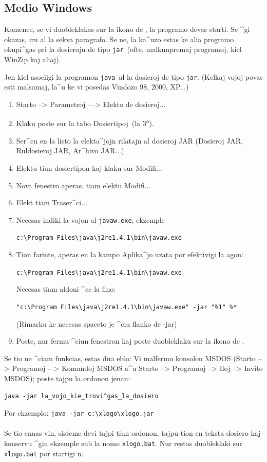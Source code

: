 \subsection{Medio Windows}
Komence, se vi duobleklakas sur la ikono de \xlogo, la programo devas
starti.  Se ^gi okazas, iru al la sekva paragrafo.  Se ne, la ka^uzo
estas ke alia programo okupi^gas pri la dosierojn de tipo
\og\texttt{jar}\fg\ (ofte, malkunpremaj programoj, kiel WinZip kaj
aliaj).

Jen kiel asociigi la programon \og\texttt{java}\fg\ al la dosieroj de
tipo \og \texttt{jar}\fg.  (Kelkaj vojoj povas esti malsamaj, la^u ke
vi posedas Vindozo 98, 2000, XP...)
\begin{enumerate}
\item Starto –> Parametroj —> Elekto de dosieroj...
\item Klaku poste sur la tabo \og Dosiertipoj\fg\ (la
  3\textsuperscript{a}).
\item Ser^cu en la listo la elekta^jojn rilatajn al dosieroj JAR
  (Dosieroj JAR, Ruldosieroj JAR, Ar^hivo JAR...)
\item Elektu tiun dosiertipon kaj klaku sur \og Modifi...\fg 
\item Nova fenestro aperas, tiam elektu \og Modifi... \fg 
\item Elekt tiam \og Traser^ci...\fg
\item Necesas indiki la vojon al \texttt{javaw.exe}, ekzemple
\begin{center}
 \texttt{c:\textbackslash Program Files\textbackslash java\textbackslash j2re1.4.1\textbackslash bin\textbackslash javaw.exe}
\end{center}
\item Tion farinte, aperas en la kampo Aplika^jo uzata por efektivigi
  la agon:
\begin{center}
 \texttt{c:\textbackslash Program Files\textbackslash java\textbackslash j2re1.4.1\textbackslash bin\textbackslash javaw.exe}
\end{center}
Necesas tiam aldoni ^ce la fino:
\begin{center}
\texttt{"c:\textbackslash Program Files\textbackslash java\textbackslash j2re1.4.1\textbackslash bin\textbackslash javaw.exe" -jar "\%1" \%*}
\end{center} 
(Rimarku ke necesas spaceto je ^ciu flanko de -jar)
\item Poste, nur fermu ^ciun fenestron kaj poste duobleklaku sur la
  ikono de \xlogo.
\end{enumerate}
Se tio ne ^ciam funkcias, estas dua eblo: Vi malfermu konsolon MSDOS
(Starto --> Programoj -–> Komandoj MSDOS a^u Starto --> Programoj -->
Iloj --> Invito MSDOS); poste tajpu la ordonon jenan:
\begin{center}
 \texttt{java -jar la\_vojo\_kie\_trovi^gas\_la\_dosiero}
\end{center}
Por ekzemplo: \texttt{java -jar c:\textbackslash xlogo\textbackslash xlogo.jar}\\ \\
Se tio enuas vin, sisteme devi tajpi tiun ordonon, tajpu tion en
teksta dosiero kaj konservu ^gin ekzemple sub la nomo
\texttt{xlogo.bat}.  Nur restas duobleklaki sur \texttt{xlogo.bat} por
startigi \xlogo n.

